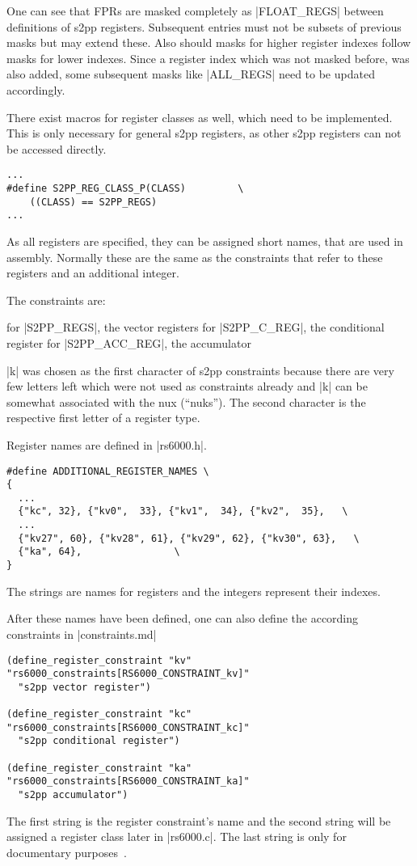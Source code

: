 One can see that \acp{FPR} are masked completely as |FLOAT_REGS| between definitions of \ac{s2pp} registers.
Subsequent entries must not be subsets of previous masks but may extend these.
Also should masks for higher register indexes follow masks for lower indexes.
Since a register index which was not masked before, was also added, some subsequent masks like |ALL_REGS| need to be updated accordingly.

There exist macros for register classes as well, which need to be implemented.
This is only necessary for general \ac{s2pp} registers, as other \ac{s2pp} registers can not be accessed directly.
\begin{lstlisting}
...
#define S2PP_REG_CLASS_P(CLASS)         \
    ((CLASS) == S2PP_REGS)
...
\end{lstlisting}

As all registers are specified, they can be assigned short names, that are used in assembly.
Normally these are the same as the constraints that refer to these registers and an additional integer.

The constraints are:
\begin{description}
         for |S2PP_REGS|, the vector registers
         for |S2PP_C_REG|, the conditional register
         for |S2PP_ACC_REG|, the accumulator
\end{description}

|k| was chosen as the first character of s2pp constraints because there are very few letters left which were not used as constraints already and |k| can be somewhat associated with the nux (``nuks'').
The second character is the respective first letter of a register type.

Register names are defined in |rs6000.h|.
\begin{lstlisting}
#define ADDITIONAL_REGISTER_NAMES \
{
  ...
  {"kc", 32}, {"kv0",  33}, {"kv1",  34}, {"kv2",  35},   \
  ...
  {"kv27", 60}, {"kv28", 61}, {"kv29", 62}, {"kv30", 63},   \
  {"ka", 64},                \
}
\end{lstlisting}
The strings are names for registers and the integers represent their indexes.

After these names have been defined, one can also define the according constraints in |constraints.md|
\begin{lstlisting}
(define_register_constraint "kv" "rs6000_constraints[RS6000_CONSTRAINT_kv]"
  "s2pp vector register")

(define_register_constraint "kc" "rs6000_constraints[RS6000_CONSTRAINT_kc]"
  "s2pp conditional register")

(define_register_constraint "ka" "rs6000_constraints[RS6000_CONSTRAINT_ka]"
  "s2pp accumulator")
\end{lstlisting}
The first string is the register constraint's name and the second string will be assigned a register class later in |rs6000.c|.
The last string is only for documentary purposes~\citep[ch.~16.8]{GCCint}.

